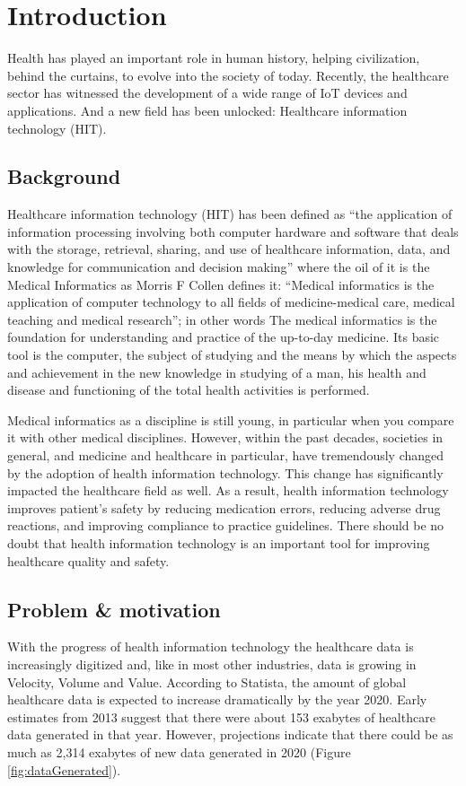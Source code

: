 
\chapter{Introduction}


Health has played an important role in human history, helping civilization, behind the curtains, to evolve into the society of today\cite{xu2020privacy}. Recently, the healthcare sector has witnessed the development of a wide range of IoT devices and applications\cite{nasiri2019security}. And a new field has been unlocked: Healthcare information technology (HIT).

\section{Background}
Healthcare information technology (HIT) has been defined as \enquote{the application of information processing involving both computer hardware and software that deals with the storage, retrieval, sharing, and use of healthcare information, data, and knowledge for communication and decision making\cite{brailer2004decade}} where the oil of it is the Medical Informatics as Morris F Collen defines it: \enquote{Medical informatics is the application of computer technology to all fields of medicine-medical care, medical teaching and medical research}; in other words The medical informatics is the foundation for understanding and practice of the up-to-day medicine. Its basic tool is the computer, the subject of studying and the means by which the aspects and achievement in the new knowledge in studying of a man, his health and disease and functioning of the total health activities is performed\cite{masic2013history}.

Medical informatics as a discipline is still young, in particular when you compare it with other medical disciplines. However, within the past decades, societies in general, and medicine and healthcare in particular, have tremendously changed by the adoption of health information technology. This change has significantly impacted the healthcare field as well\cite{haux2010medical}. As a result,  health information technology improves patient’s safety by reducing medication errors, reducing adverse drug reactions, and improving compliance to practice guidelines. There should be no doubt that health information technology is an important tool for improving healthcare quality and safety\cite{alotaibi2017impact}.


\section{Problem \& motivation}
With the progress of health information technology the healthcare data is increasingly digitized and, like in most other industries, data is growing in Velocity, Volume and Value. According to Statista\cite{HealthcareDataVolume}, the amount of global healthcare data is expected to increase dramatically by the year 2020. Early estimates from 2013 suggest that there were about 153 exabytes of healthcare data generated in that year. However, projections indicate that there could be as much as 2,314 exabytes of new data generated in 2020 (Figure \ref{fig:dataGenerated}).

